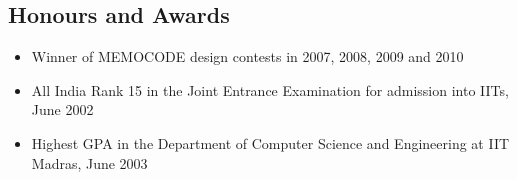 \documentclass[margin]{resume}
\begin{document}
\begin{resume}
    \section{\mysidestyle Honours and Awards} 

	\begin{itemize}
  \item Winner of MEMOCODE design contests in 2007, 2008, 2009 and 2010
  \item All India Rank 15 in the Joint Entrance Examination for admission into IITs, June 2002
  \item Highest GPA in the Department of Computer Science and Engineering at IIT Madras, June 2003
  \end{itemize}


\end{resume}
\end{document}
